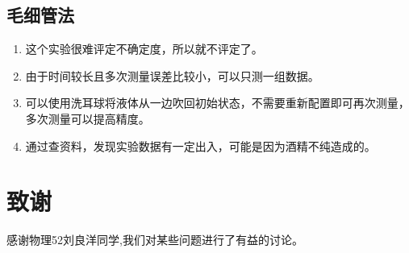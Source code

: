 \documentclass[12pt,a4paper]{ctexart}
\begin{document}
\subsection{毛细管法}
\begin{enumerate}
	
	\item 这个实验很难评定不确定度，所以就不评定了。
	\item 由于时间较长且多次测量误差比较小，可以只测一组数据。
	\item 可以使用洗耳球将液体从一边吹回初始状态，不需要重新配置即可再次测量，多次测量可以提高精度。
	\item 通过查资料，发现实验数据有一定出入，可能是因为酒精不纯造成的。
\end{enumerate}
\section{致谢}

感谢物理52刘良洋同学,我们对某些问题进行了有益的讨论。


\nocite{jcwlsyjy,jcwlsyjc}

\end{document}
